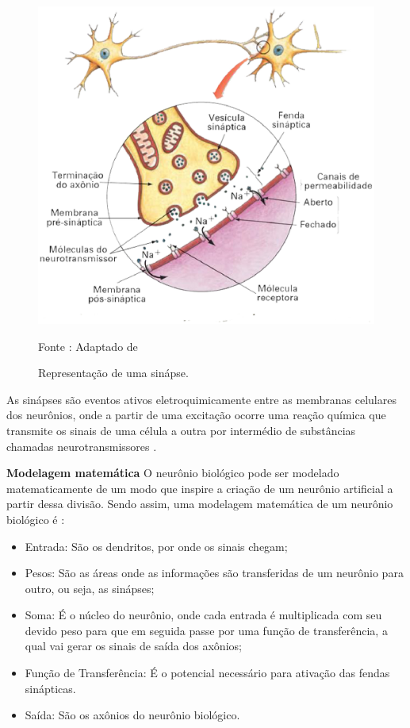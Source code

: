     \begin{figure}[ht]
        \centering
        \label{fig02}
            \includegraphics[keepaspectratio=true, scale=0.4]{editaveis/images/sinapse.eps}
        \caption{Representação de uma sinápse.}
        Fonte : Adaptado de \cite{marieb2009}
    \end{figure}

    As sinápses são eventos ativos eletroquimicamente entre as membranas celulares dos neurônios, onde a partir de uma excitação ocorre uma reação química que transmite os sinais de uma célula a outra por intermédio de substâncias chamadas neurotransmissores \cite{marieb2009}.

\noindent
\textbf{Modelagem matemática}
    O neurônio biológico pode ser modelado matematicamente de um modo que inspire a criação de um neurônio artificial a partir dessa divisão. Sendo assim, uma modelagem matemática de um neurônio biológico é \cite{rocha2006}:

    \begin{itemize}
        \item Entrada: São os dendritos, por onde os sinais chegam;
        \item Pesos: São as áreas onde as informações são transferidas de um neurônio para outro,  ou seja, as sinápses;
        \item Soma: É o núcleo do neurônio, onde cada entrada é multiplicada com seu devido peso para que em seguida passe por uma função de transferência, a qual vai gerar os sinais de saída dos axônios;
        \item Função de Transferência: É o potencial necessário para ativação das fendas sinápticas.
        \item Saída: São os axônios do neurônio biológico.
    \end{itemize}

